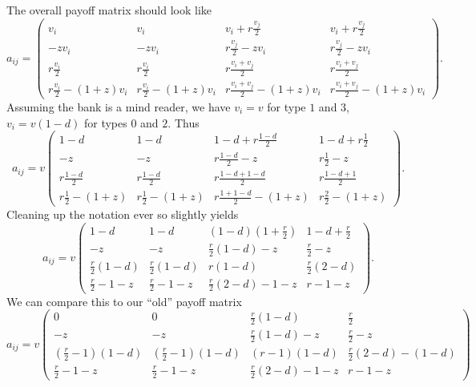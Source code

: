 \documentclass[13pt]{amsart}
\begin{document}
The overall payoff matrix should look like
\begin{equation}
    a_{ij} =
    \begin{pmatrix}
        v_i & v_i & v_i + r\frac{v_j}{2} & v_i + r\frac{v_j}{2} \\
        -zv_i & -zv_i & r\frac{v_j}{2} - zv_i & r\frac{v_j}{2} - zv_i \\
        r\frac{v_i}{2} & r\frac{v_i}{2} & r\frac{v_i + v_j}{2} & r\frac{v_i + v_j}{2} \\
        r\frac{v_i}{2} - (1+z)v_i & r\frac{v_i}{2} - (1+z)v_i & r\frac{v_i + v_j}{2} - (1+z)v_i & r\frac{v_i + v_j}{2} - (1+z)v_i
    \end{pmatrix}.
\end{equation}
Assuming the bank is a mind reader, we have $v_i = v$ for type $1$ and $3$, $v_i = v(1-d)$ for types $0$ and $2$.
Thus
\begin{equation}
    a_{ij} =
    v\begin{pmatrix}
        1-d & 1-d & 1-d + r\frac{1-d}{2} & 1-d + r\frac{1}{2} \\
        -z & -z & r\frac{1-d}{2} - z & r\frac{1}{2} - z \\
        r\frac{1-d}{2} & r\frac{1-d}{2} & r\frac{1-d + 1-d}{2} & r\frac{1-d + 1}{2} \\
        r\frac{1}{2} - (1+z) & r\frac{1}{2} - (1+z) & r\frac{1 + 1-d}{2} - (1+z) & r\frac{2}{2} - (1+z)
    \end{pmatrix}.
\end{equation}
Cleaning up the notation ever so slightly yields
\begin{equation}
    a_{ij} = v
    \begin{pmatrix}
        1-d & 1-d & (1-d)(1+\frac{r}{2}) & 1-d + \frac{r}{2} \\
        -z & -z & \frac{r}{2}(1-d) -z & \frac{r}{2} -z \\
        \frac{r}{2}(1-d) & \frac{r}{2}(1-d) & r(1-d) & \frac{r}{2}(2 - d)\\
        \frac{r}{2} - 1 - z & \frac{r}{2} - 1 - z & \frac{r}{2}(2 - d) - 1 - z & r - 1 -z
    \end{pmatrix}.
\end{equation}
We can compare this to our ``old'' payoff matrix \begin{equation}
    a_{ij} = v
    \begin{pmatrix}
        0 & 0 & \frac{r}{2}(1-d) & \frac{r}{2} \\
        -z & -z & \frac{r}{2}(1-d) -z & \frac{r}{2} -z \\
        (\frac{r}{2} - 1)(1-d) & (\frac{r}{2} - 1)(1-d) & (r-1)(1-d)& \frac{r}{2}(2 - d) - (1-d)\\
        \frac{r}{2} - 1 - z & \frac{r}{2} - 1 -z & \frac{r}{2}(2 - d) - 1 - z & r - 1 -z
    \end{pmatrix}
\end{equation}
\end{document}
